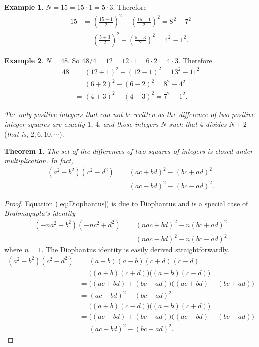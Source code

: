 \documentclass{article}
\newtheorem{theorem}{Theorem}
\theoremstyle{definition}
\newtheorem{example}{Example}[section]
\begin{document}
\begin{example}
\(N = 15 = 15\cdot 1 = 5\cdot 3\). Therefore \[ \begin{aligned} 15 &= \left(\frac{15+1}{2}\right)^2 - \left(\frac{15-1}{2}\right)^2 = \boxed{8^2 - 7^2} \\ &= \left(\frac{5+3}{2}\right)^2 - \left(\frac{5-3}{2}\right)^2 = \boxed{4^2-1^2}. \end{aligned} \]
\end{example}

\begin{example}
\(N=48\). So \(48/4 = 12 = 12\cdot 1 = 6\cdot 2 = 4\cdot 3\). Therefore \[ \begin{aligned}
48 &= (12+1)^2-(12-1)^2 = \boxed{13^2-11^2} \\ &= (6+2)^2-(6-2)^2 = \boxed{8^2-4^2} \\ &= (4+3)^2-(4-3)^2 = \boxed{7^2-1^2}. \end{aligned} \]
\end{example}

\textit{The only positive integers that can not be written as the difference of two positive integer squares are exactly} \(1\), \(4\), \textit{and those integers \(N\) such that \(4\) divides \(N+2\)} (\textit{that is}, \(2, 6, 10, \cdots\)).

\begin{theorem}
The set of the differences of two squares of integers is closed under multiplication. In fact,
\begin{equation}\begin{aligned}
(a^2-b^2)(c^2-d^2) &= (ac+bd)^2-(bc+ad)^2 \\ &= (ac-bd)^2-(bc-ad)^2.
\end{aligned}\label{eq:Diophantus}
\end{equation}
\end{theorem}
\begin{proof}
Equation (\ref{eq:Diophantus}) is due to Diophantus and is a special case of \textit{Brahmagupta's identity}
\begin{equation}
\begin{aligned}
(-na^2+b^2)(-nc^2+d^2) &= (nac+bd)^2-n(bc+ad)^2 \\ &= (nac-bd)^2-n(bc-ad)^2
\end{aligned}
\label{eq:Brahmagupta}
\end{equation} where \(n=1\). The Diophantus identity is easily derived straightforwardly.
\[\begin{aligned}
(a^2-b^2)(c^2-d^2) &= (a+b)(a-b)(c+d)(c-d) \\ &= \big((a+b)(c+d)\big) \big((a-b)(c-d)\big) \\ &= \big((ac+bd)+(bc+ad)\big) \big((ac+bd)-(bc+ad)\big) \\ &= \boxed{(ac+bd)^2-(bc+ad)^2} \\ &= \big((a+b)(c-d)\big) \big((a-b)(c+d)\big) \\ &= \big((ac-bd)+(bc-ad)\big) \big((ac-bd)-(bc-ad)\big) \\ &= \boxed{(ac-bd)^2-(bc-ad)^2}.
\end{aligned}\]
\end{proof}
\end{document}
